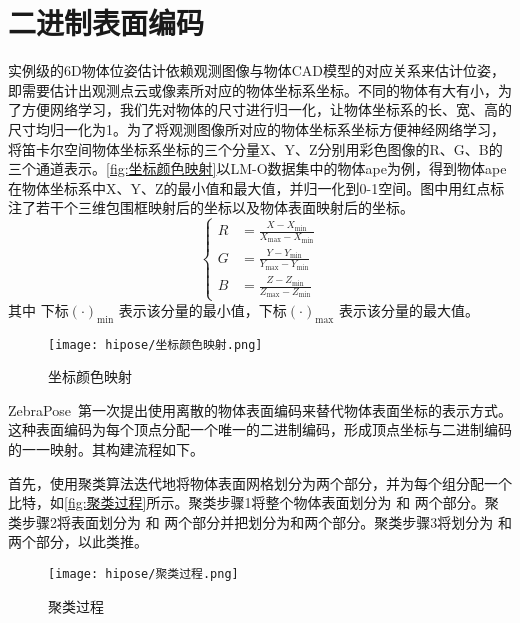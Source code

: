 \section{二进制表面编码}
\label{sec:hipose_encoding}
实例级的6D物体位姿估计依赖观测图像与物体CAD模型的对应关系来估计位姿，即需要估计出观测点云或像素所对应的物体坐标系坐标。不同的物体有大有小，为了方便网络学习，我们先对物体的尺寸进行归一化，让物体坐标系的长、宽、高的尺寸均归一化为1。为了将观测图像所对应的物体坐标系坐标方便神经网络学习，将笛卡尔空间物体坐标系坐标的三个分量X、Y、Z分别用彩色图像的R、G、B的三个通道表示。\autoref{fig:坐标颜色映射}以LM-O数据集中的物体ape为例，得到物体ape在物体坐标系中X、Y、Z的最小值和最大值，并归一化到0-1空间。图中用红点标注了若干个三维包围框映射后的坐标以及物体表面映射后的坐标。
\begin{equation}
    \left\{
    \begin{aligned}
        R &= \frac{X - X_{\min}}{X_{\max} - X_{\min}} \\
        G &= \frac{Y - Y_{\min}}{Y_{\max} - Y_{\min}} \\
        B &= \frac{Z - Z_{\min}}{Z_{\max} - Z_{\min}}
    \end{aligned}
    \right.
\end{equation}
其中 下标$(\cdot)_{\min}$ 表示该分量的最小值，下标$(\cdot)_{\max}$ 表示该分量的最大值。

\begin{figure}[ht]
    \centering
    \texttt{[image: hipose/坐标颜色映射.png]}
    \caption{坐标颜色映射}
    \label{fig:坐标颜色映射}
\end{figure}

ZebraPose~\cite{su2022zebrapose}第一次提出使用离散的物体表面编码来替代物体表面坐标的表示方式。这种表面编码为每个顶点分配一个唯一的二进制编码，形成顶点坐标与二进制编码的一一映射。其构建流程如下。

首先，使用聚类算法迭代地将物体表面网格划分为两个部分，并为每个组分配一个比特，如\autoref{fig:聚类过程}所示。聚类步骤1将整个物体表面划分为  和 两个部分。聚类步骤2将表面划分为 和 两个部分并把划分为和两个部分。聚类步骤3将划分为  和 两个部分，以此类推。

\begin{figure}[htbp]
    \centering
    \texttt{[image: hipose/聚类过程.png]}
    \caption{聚类过程}
    \label{fig:聚类过程}
\end{figure}

